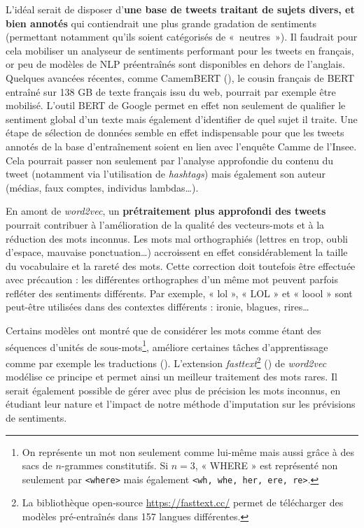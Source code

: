 \documentclass[11pt,french,french]{article}
\let\rmarkdownfootnote\footnote%
\def\footnote{\protect\rmarkdownfootnote}
\begin{document}
L'idéal serait de disposer d'\textbf{une base de tweets traitant de
sujets divers, et bien annotés} qui contiendrait une plus grande
gradation de sentiments (permettant notamment qu'ils soient catégorisés
de «~neutres~»). Il faudrait pour cela mobiliser un analyseur de
sentiments performant pour les tweets en français, or peu de modèles de
NLP préentraînés sont disponibles en dehors de l'anglais. Quelques
avancées récentes, comme CamemBERT (\cite{Martin}), le cousin français
de BERT entraîné sur 138 GB de texte français issu du web, pourrait par
exemple être mobilisé. L'outil BERT de Google permet en effet non
seulement de qualifier le sentiment global d'un texte mais également
d'identifier de quel sujet il traite. Une étape de sélection de données
semble en effet indispensable pour que les tweets annotés de la base
d'entraînement soient en lien avec l'enquête Camme de l'Insee. Cela
pourrait passer non seulement par l'analyse approfondie du contenu du
tweet (notamment via l'utilisation de \emph{hashtags}) mais également
son auteur (médias, faux comptes, individus lambdas\dots).

En amont de \emph{word2vec}, un \textbf{prétraitement plus approfondi
des tweets} pourrait contribuer à l'amélioration de la qualité des
vecteurs-mots et à la réduction des mots inconnus. Les mots mal
orthographiés (lettres en trop, oubli d'espace, mauvaise
ponctuation\dots) accroissent en effet considérablement la taille du
vocabulaire et la rareté des mots. Cette correction doit toutefois être
effectuée avec précaution : les différentes orthographes d'un même mot
peuvent parfois refléter des sentiments différents. Par exemple, « lol
», « LOL » et « loool » sont peut-être utilisées dans des contextes
différents : ironie, blagues, rires\dots 

Certains modèles ont montré que de considérer les mots comme étant des
séquences d'unités de sous-mots\footnote{On représente un mot non
  seulement comme lui-même mais aussi grâce à des sacs de \(n\)-grammes
  constitutifs. Si \(n = 3\), « WHERE » est représenté non seulement par
  \texttt{\textless{}where\textgreater{}} mais également
  \texttt{\textless{}wh,\ whe,\ her,\ ere,\ re\textgreater{}}.},
améliore certaines tâches d'apprentissage comme par exemple les
traductions (\cite{Sennrich}). L'extension \emph{fasttext}\footnote{La
  bibliothèque open-source \url{https://fasttext.cc/} permet de
  télécharger des modèles pré-entraînés dans 157 langues différentes.}
(\cite{Bojanowski}) de \emph{word2vec} modélise ce principe et permet
ainsi un meilleur traitement des mots rares. Il serait également
possible de gérer avec plus de précision les mots inconnus, en étudiant
leur nature et l'impact de notre méthode d'imputation sur les prévisions
de sentiments.
\end{document}
